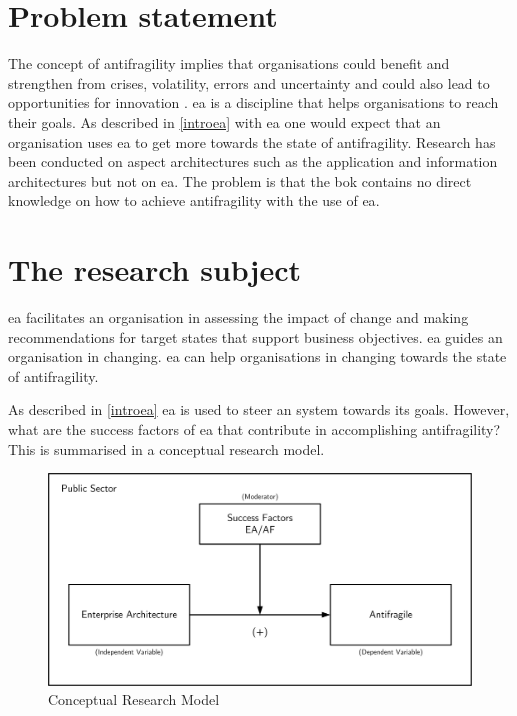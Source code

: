 \section{Problem statement}
\label{sec:problemstatement}
The concept of \gls{antifragility} implies that organisations could benefit and strengthen from crises, volatility, errors and uncertainty and could also lead to opportunities for innovation \parencite{Kastner2017}. \acrshort{ea} is a discipline that helps organisations to reach their goals. As described in \cref{introea} with \acrshort{ea} one would expect that an organisation uses \acrshort{ea} to get more towards the state of \gls{antifragility}. Research has been conducted on aspect architectures such as the application and information architectures but not on \acrshort{ea}. The problem is that the \acrlong{bok} contains no direct knowledge on how to achieve \gls{antifragility} with the use of \acrshort{ea}. 

\section{The research subject}
\label{sec:researchsubject}
\acrshort{ea} facilitates an organisation in assessing the impact of change and making recommendations for target states that support business objectives. \acrshort{ea} guides an organisation in changing. \acrshort{ea} can help organisations in changing towards the state of \gls{antifragility}.

As described in \ref{introea} \acrshort{ea} is used to steer an system towards its goals. However, what are the success factors of \acrshort{ea} that contribute in accomplishing \gls{antifragility}? This is summarised in a conceptual research model.
\begin{figure}[H]
	\centering
	\includegraphics[width=0.8\linewidth]{images/conceptualmodel}
	\caption[Conceptual Research Model]{Conceptual Research Model}
	\label{fig:conceptualmodel}
\end{figure}

